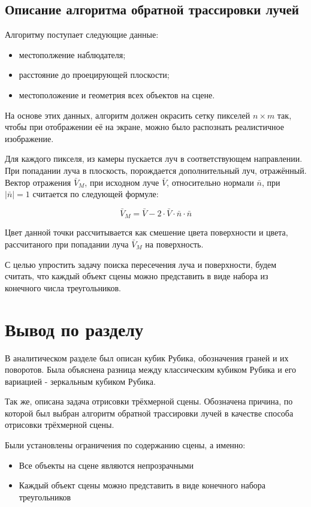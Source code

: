 \documentclass[a4paper, 14pt]{report} %
\begin{document}
	\subsection{Описание алгоритма обратной трассировки лучей}
	Алгоритму поступает следующие данные:
	\begin{itemize}
		\item местополжение наблюдателя;
		\item расстояние до проецирующей плоскости;
		\item местоположение и геометрия всех объектов на сцене.
	\end{itemize}

	На основе этих данных, алгоритм должен окрасить сетку пикселей $n\times m$ так, чтобы при отображении её на экране, можно было распознать реалистичное изображение.
	
	Для каждого пикселя, из камеры пускается луч в соответствующем направлении. При попадании луча в плоскость, порождается дополнительный луч, отражённый. Вектор отражения $\bar V_M$, при исходном луче $\bar V$, относительно нормали $\bar n$, при $|\bar n| = 1$ считается по следующей формуле:
	
	\begin{equation}
		\bar V_M = \bar V - 2\cdot\bar V \cdot\bar n\cdot\bar n
		\label{eq:bounce}
	\end{equation}

	Цвет данной точки рассчитывается как смешение цвета поверхности и цвета, рассчитаного при попадании луча $\bar V_M$ на поверхность.
	
	С целью упростить задачу поиска пересечения луча и поверхности, будем считать, что каждый объект сцены можно представить в виде набора из конечного числа треугольников.
	
	\section{Вывод по разделу}
	В аналитическом разделе был описан кубик Рубика, обозначения граней и их поворотов. Была объяснена разница между классическим кубиком Рубика и его вариацией - зеркальным кубиком Рубика.
	
	Так же, описана задача отрисовки трёхмерной сцены. Обозначена причина, по которой был выбран алгоритм обратной трассировки лучей в качестве способа отрисовки трёхмерной сцены.
	
	Были установлены ограничения по содержанию сцены, а именно:
	\begin{itemize}
		\item Все объекты на сцене являются непрозрачными
		\item Каждый объект сцены можно представить в виде конечного набора треугольников
	\end{itemize}
		
\end{document}
